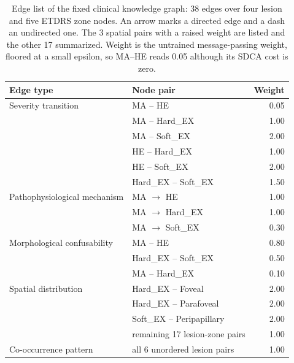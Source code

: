\begin{table}[htbp]
\centering
\caption{Edge list of the fixed clinical knowledge graph: 38 edges over four lesion and five ETDRS zone nodes. An arrow marks a directed edge and a dash an undirected one. The 3 spatial pairs with a raised weight are listed and the other 17 summarized. Weight is the untrained message-passing weight, floored at a small epsilon, so MA--HE reads 0.05 although its SDCA cost is zero.}
\label{tab:kg_edges}
\footnotesize
\setlength{\tabcolsep}{4pt}
\begin{tabular}{ll r}
\toprule
Edge type & Node pair & Weight \\
\midrule
Severity transition & MA -- HE & 0.05 \\
 & MA -- Hard\_EX & 1.00 \\
 & MA -- Soft\_EX & 2.00 \\
 & HE -- Hard\_EX & 1.00 \\
 & HE -- Soft\_EX & 2.00 \\
 & Hard\_EX -- Soft\_EX & 1.50 \\
\midrule
Pathophysiological mechanism & MA $\rightarrow$ HE & 1.00 \\
 & MA $\rightarrow$ Hard\_EX & 1.00 \\
 & MA $\rightarrow$ Soft\_EX & 0.30 \\
\midrule
Morphological confusability & MA -- HE & 0.80 \\
 & Hard\_EX -- Soft\_EX & 0.50 \\
 & MA -- Hard\_EX & 0.10 \\
\midrule
Spatial distribution & Hard\_EX -- Foveal & 2.00 \\
 & Hard\_EX -- Parafoveal & 2.00 \\
 & Soft\_EX -- Peripapillary & 2.00 \\
 & remaining 17 lesion-zone pairs & 1.00 \\
\midrule
Co-occurrence pattern & all 6 unordered lesion pairs & 1.00 \\
\bottomrule
\end{tabular}
\end{table}
